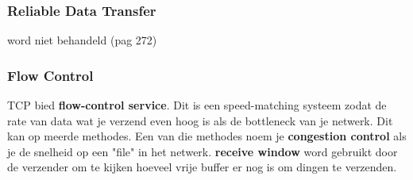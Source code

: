 \subsubsection{Reliable Data Transfer}
word niet behandeld (pag 272)
\subsubsection{Flow Control}
TCP bied \textbf{flow-control service}. Dit is een speed-matching systeem zodat de rate van data wat je verzend even
hoog is als de bottleneck van je netwerk. Dit kan op meerde methodes. Een van die methodes noem je \textbf{congestion
control} als je de snelheid op een "file" in het netwerk.
\newline
\textbf{receive window} word gebruikt door de verzender om te kijken hoeveel vrije buffer er nog is om dingen te
verzenden.


